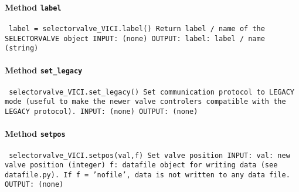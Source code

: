 \paragraph{Method \texttt{label}}
\vspace{1ex}
\texttt{\newline
label = selectorvalve_VICI.label()\newline
\newline
Return label / name of the SELECTORVALVE object\newline
\newline
INPUT:\newline
(none)\newline
\newline
OUTPUT:\newline
label: label / name (string)\newline
\newline
}

\paragraph{Method \texttt{set_legacy}}
\vspace{1ex}
\texttt{\newline
selectorvalve_VICI.set_legacy()\newline
\newline
Set communication protocol to LEGACY mode (useful to make the newer valve controlers compatible with the LEGACY protocol).\newline
\newline
INPUT:\newline
(none)\newline
\newline
OUTPUT:\newline
(none)\newline
\newline
}

\paragraph{Method \texttt{setpos}}
\vspace{1ex}
\texttt{\newline
selectorvalve_VICI.setpos(val,f)\newline
\newline
Set valve position\newline
\newline
INPUT:\newline
val: new valve position (integer)\newline
f: datafile object for writing data (see datafile.py). If f = 'nofile', data is not written to any data file.\newline
\newline
OUTPUT:\newline
(none)\newline
\newline
}

